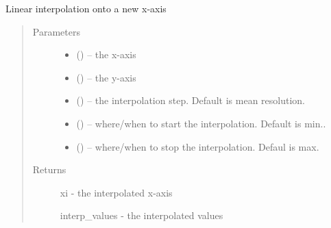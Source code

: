 \documentclass[letterpaper,10pt,english]{sphinxmanual}
\begin{document}

\begin{fulllineitems}
\label{\detokenize{Timeseries:pyleoclim.Timeseries.interp}}
Linear interpolation onto a new x-axis
\begin{quote}\begin{description}
\item[{Parameters}] \leavevmode\begin{itemize}
\item {} 
 () -- the x-axis

\item {} 
 () -- the y-axis

\item {} 
 () -- the interpolation step. Default is mean resolution.

\item {} 
 () -- where/when to start the interpolation. Default is min..

\item {} 
 () -- where/when to stop the interpolation. Defaul is max.

\end{itemize}

\item[{Returns}] \leavevmode

xi - the interpolated x-axis

interp\_values - the interpolated values


\end{description}\end{quote}

\end{fulllineitems}

\end{document}
